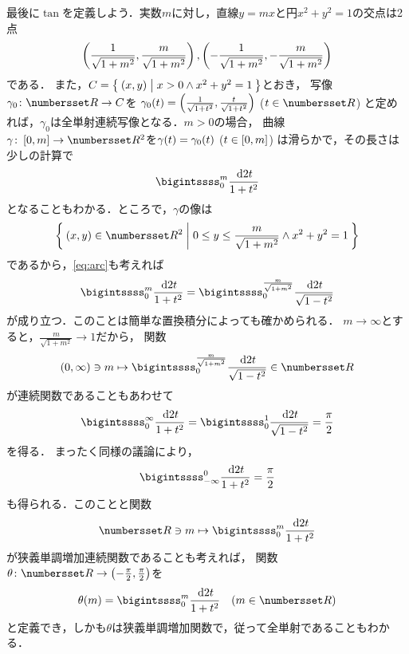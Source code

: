 \documentclass[11pt,a4paper]{ltjsarticle}
\newcommand*{\coord}[1]{\paren{#1}}
\newcommand*{\maparrow}{\rightarrow}
\newcommand*{\intd}{\dl2}
\theoremstyle{definition}
\begin{document}
最後に$\tan$を定義しよう．実数$m$に対し，直線$y = mx$と円$x^2 + y^2 = 1$の交点は2点
\begin{align}
  \coord{\frac{1}{\sqrt{1 + m^2}}, \frac{m}{\sqrt{1 + m^2}}},
  \coord{- \frac{1}{\sqrt{1 + m^2}}, - \frac{m}{\sqrt{1 + m^2}}}
  \label{eq:crosspoint}
\end{align}
である．
また，$C = \setintension{\coord{x,y}}{x > 0 \land x^2 + y^2 = 1}$とおき，
写像$\gamma_0 \colon \Real \maparrow C$を
$\apply{\gamma_0}{t} = \coord{\frac{1}{\sqrt{1 + t^2}}, \frac{t}{\sqrt{1 + t^2}}}$ ($t \in \Real$)
と定めれば，$\gamma_0$は全単射連続写像となる．$m > 0$の場合，
曲線$\gamma \colon \interval{c}{0,m} \maparrow \Real^2$を$\apply{\gamma}{t} = \apply{\gamma_0}{t}$ ($t \in \interval{c}{0,m}$)
は滑らかで，その長さは少しの計算で
\begin{align}
  \bigintssss_0^m \frac{\intd t}{1 + t^2}
  \label{eq:arctan}
\end{align}
となることもわかる．ところで，$\gamma$の像は
\[
  \setintension{\coord{x,y} \in \Real^2}{0 \leq y \leq \frac{m}{\sqrt{1 + m^2}} \land x^2 + y^2 = 1}
\]
であるから，\cref{eq:arc}も考えれば
\begin{align}
  \bigintssss_0^m \frac{\intd t}{1 + t^2} = \bigintssss_0^{\frac{m}{\sqrt{1 + m^2}}} \frac{\intd t}{\sqrt{1 - t^2}}
  \label{eq:angle}
\end{align}
が成り立つ．このことは簡単な置換積分によっても確かめられる．
$m \to \infty$とすると，$\frac{m}{\sqrt{1 + m^2}} \to 1$だから，
関数
\[
  \interval{op}{0,\infty} \ni m \mapsto \bigintssss_0^{\frac{m}{\sqrt{1 + m^2}}} \frac{\intd t}{\sqrt{1 - t^2}} \in \Real
\]
が連続関数であることもあわせて
\begin{align}
  \bigintssss_0^{\infty} \frac{\intd t}{1 + t^2} = \bigintssss_0^1 \frac{\intd t}{\sqrt{1 - t^2}} = \frac{\pi}{2}
  \label{eq:piint}
\end{align}
を得る．
まったく同様の議論により，
\begin{align}
  \bigintssss_{-\infty}^0 \frac{\intd t}{1 + t^2} = \frac{\pi}{2}
  \label{eq:piint2}
\end{align}
も得られる．このことと関数
\begin{align*}
  \Real \ni m \mapsto \bigintssss_0^m \frac{\intd t}{1 + t^2}
\end{align*}
が狭義単調増加連続関数であることも考えれば，
関数$\theta \colon \Real \maparrow \interval{op}{-\frac{\pi}{2}, \frac{\pi}{2}}$を
\begin{align}
  \apply{\theta}{m} = \bigintssss_0^m \frac{\intd t}{1 + t^2} \quad \text{($m \in \Real$)}
  \label{eq:arctan}
\end{align}
と定義でき，しかも$\theta$は狭義単調増加関数で，従って全単射であることもわかる．
\end{document}
